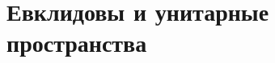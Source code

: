 \documentclass[../main.tex]{subfiles}
\begin{document}
\chapter{Евклидовы и унитарные пространства}


\end{document}
